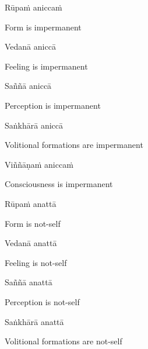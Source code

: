 Rūpaṁ aniccaṁ

\begin{english}
  Form is impermanent
\end{english}

Vedanā aniccā

\begin{english}
  Feeling is impermanent
\end{english}

Saññā aniccā

\begin{english}
  Perception is impermanent
\end{english}

Saṅkhārā aniccā

\begin{english}
    Volitional formations are impermanent\makeatletter\hyperlink{endnote18-appendix}\makeatother

\end{english}

Viññāṇaṁ aniccaṁ

\begin{english}
    Consciousness is impermanent\makeatletter\hyperlink{endnote19-appendix}\makeatother

\end{english}

Rūpaṁ anattā

\begin{english}
  Form is not-self
\end{english}

Vedanā anattā

\begin{english}
  Feeling is not-self
\end{english}

Saññā anattā

\begin{english}
  Perception is not-self
\end{english}

Saṅkhārā anattā

\begin{english}
    Volitional formations are not-self\makeatletter\hyperlink{endnote20-appendix}\makeatother

\end{english}

